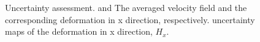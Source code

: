 \documentclass[preprint,authoryear]{elsarticle}
\begin{document}
\begin{figure}[t!]
	\begin{minipage}[b]{0.32\linewidth}
		\centering
	\end{minipage}
	\begin{minipage}[b]{0.32\linewidth}
		\centering
	\end{minipage}	
	\begin{minipage}[b]{0.32\linewidth}
		\centering
	\end{minipage}
	\caption{Uncertainty assessment. \protect{} and \protect{} The averaged velocity field and the corresponding deformation in x direction, respectively. \protect{} uncertainty maps of the deformation in x direction, $H_{x}$.}\label{fig:uncexample}	
\end{figure}
\end{document}
